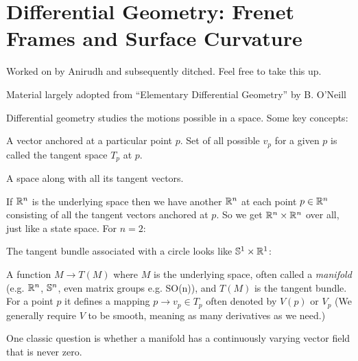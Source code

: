 \chapter{Differential Geometry: Frenet Frames and Surface Curvature}

Worked on by Anirudh and subsequently ditched. Feel free to take this up.

\begin{remark}
  Material largely adopted from ``Elementary Differential Geometry''
  by B. O'Neill
\end{remark}

Differential geometry studies the motions possible in a space. Some
key concepts:

\begin{definition}
  A vector anchored at a particular
point $p$. Set of all possible $v_p$ for a given $p$ is called the tangent
space $T_p$ at $p$.
\end{definition}


\begin{definition}
  A space along with all its tangent vectors.
\end{definition}


\begin{example}
  If $\mathbb{R}^n$ is the underlying space then we have another $\mathbb{R}^n$
  at each point $p \in \mathbb{R}^n$ consisting of all the tangent vectors
  anchored at $p$. So we get $\mathbb{R}^n \times \mathbb{R}^n$ over all, just
  like a state space. For $n = 2$:
\end{example}

\begin{example}
  The tangent bundle associated with a circle looks like
  $\mathbb{S}^1 \times \mathbb{R}^1$:
\end{example}

\begin{definition}
A function $M \rightarrow T(M)$ where $M$ is the
underlying space, often called a \textit{manifold} (e.g. $\mathbb{R}^n$,
$\mathbb{S}^n$, even matrix groups e.g. SO(n)), and $T(M)$ is the tangent
bundle. For a point $p$ it defines a mapping $p \rightarrow v_p \in
T_p$ often denoted by $V(p)$ or $V_p$ (We generally require $V$ to be
smooth, meaning as many derivatives as we need.)  
\end{definition}

One classic question is whether a manifold has a continuously varying
vector field that is never zero.

